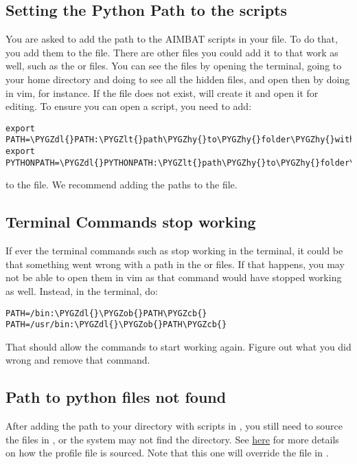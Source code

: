 \documentclass[letterpaper,10pt,english]{sphinxmanual}
\def\PYGZob{\char`\{}
\def\PYGZcb{\char`\}}
\def\PYGZlt{\char`\<}
\def\PYGZgt{\char`\>}
\def\PYGZdl{\char`\$}
\def\PYGZhy{\char`\-}
\begin{document}
\subsection{Setting the Python Path to the scripts}
\label{docfiles/install_dependencies:setting-the-python-path-to-the-scripts}
You are asked to add the path to the AIMBAT scripts in your file. To do that, you add them to the  file. There are other files you could add it to that work as well, such as the  or  files. You can see the files by opening the terminal, going to your home directory and doing  to see all the hidden files, and open then by doing  in vim, for instance. If the  file does not exist,  will create it and open it for editing.
To ensure you can open a script, you need to add:

\begin{Verbatim}[commandchars=\\\{\}]
export PATH=\PYGZdl{}PATH:\PYGZlt{}path\PYGZhy{}to\PYGZhy{}folder\PYGZhy{}with\PYGZhy{}scripts\PYGZgt{}
export PYTHONPATH=\PYGZdl{}PYTHONPATH:\PYGZlt{}path\PYGZhy{}to\PYGZhy{}folder\PYGZhy{}with\PYGZhy{}scripts\PYGZgt{}
\end{Verbatim}

to the  file. We recommend adding the paths to the  file.


\subsection{Terminal Commands stop working}
\label{docfiles/install_dependencies:terminal-commands-stop-working}
If ever the terminal commands such as  stop working in the terminal, it could be that something went wrong with a path in the  or  files. If that happens, you may not be able to open them in vim as that command would have stopped working as well. Instead, in the terminal, do:

\begin{Verbatim}[commandchars=\\\{\}]
PATH=/bin:\PYGZdl{}\PYGZob{}PATH\PYGZcb{}
PATH=/usr/bin:\PYGZdl{}\PYGZob{}PATH\PYGZcb{}
\end{Verbatim}

That should allow the commands to start working again. Figure out what you did wrong and remove that command.


\subsection{Path to python files not found}
\label{docfiles/install_dependencies:path-to-python-files-not-found}
After adding the path to your directory with scripts in , you still need to source the  files in , or the system may not find the directory. See \href{http://publib.boulder.ibm.com/infocenter/pseries/v5r3/index.jsp?topic=/com.ibm.aix.baseadmn/doc/baseadmndita/prof\_file.htm}{here} for more details on how the profile file is sourced. Note that this one will override the file in .
\end{document}
